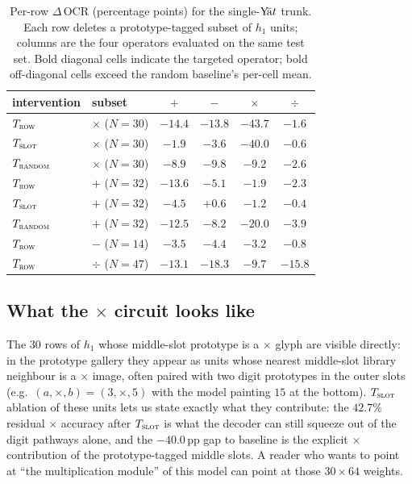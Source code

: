 \documentclass[11pt]{article}
\theoremstyle{papsty}
\newcommand{\yat}{$\textnormal{Y}\!\bar{\text{a}}t$}
\begin{document}
\begin{table}[t]
  \centering
  \small
  \caption{Per-row $\Delta$\,OCR (percentage points) for the single-\yat{} trunk.
    Each row deletes a prototype-tagged subset of $h_1$ units;
    columns are the four operators evaluated on the same test set.
    Bold diagonal cells indicate the targeted operator;
    bold off-diagonal cells exceed the random baseline's per-cell mean.}
  \label{tab:intervene}
  \begin{tabular}{l l cccc}
    \toprule
    intervention & subset & $+$ & $-$ & $\times$ & $\div$ \\
    \midrule
    $T_{\textsc{row}}$    & $\times$ ($N\!=\!30$) & $-14.4$ & $-13.8$ & $\mathbf{-43.7}$ & $-1.6$ \\
    $T_{\textsc{slot}}$   & $\times$ ($N\!=\!30$) & $-1.9$  & $-3.6$  & $\mathbf{-40.0}$ & $-0.6$ \\
    $T_{\textsc{random}}$ & $\times$ ($N\!=\!30$) & $-8.9$  & $-9.8$  & $\mathbf{-9.2}$  & $-2.6$ \\
    \midrule
    $T_{\textsc{row}}$    & $+$ ($N\!=\!32$)      & $\mathbf{-13.6}$ & $-5.1$ & $-1.9$ & $-2.3$ \\
    $T_{\textsc{slot}}$   & $+$ ($N\!=\!32$)      & $\mathbf{-4.5}$  & $+0.6$ & $-1.2$ & $-0.4$ \\
    $T_{\textsc{random}}$ & $+$ ($N\!=\!32$)      & $\mathbf{-12.5}$ & $-8.2$ & $-20.0$ & $-3.9$ \\
    \midrule
    $T_{\textsc{row}}$    & $-$ ($N\!=\!14$)      & $-3.5$ & $\mathbf{-4.4}$ & $-3.2$ & $-0.8$ \\
    $T_{\textsc{row}}$    & $\div$ ($N\!=\!47$)   & $-13.1$ & $-18.3$ & $-9.7$ & $\mathbf{-15.8}$ \\
    \bottomrule
  \end{tabular}
\end{table}

\subsection{What the $\times$ circuit looks like}
The $30$ rows of $h_1$ whose middle-slot prototype is a $\times$ glyph
are visible directly: in the prototype gallery they appear as units
whose nearest middle-slot library neighbour is a $\times$ image, often
paired with two digit prototypes in the outer slots (e.g.\
$(a, \times, b) = (3, \times, 5)$ with the model painting $15$ at the
bottom). $T_{\textsc{slot}}$ ablation of these units lets us state exactly
what they contribute: the $42.7\%$ residual $\times$ accuracy after
$T_{\textsc{slot}}$ is what the decoder can still squeeze out of the
digit pathways alone, and the $-40.0$\,pp gap to baseline is the
explicit $\times$ contribution of the prototype-tagged middle slots.
A reader who wants to point at ``the multiplication module'' of this
model can point at those $30 \times 64$ weights.
\end{document}
